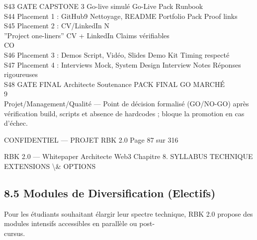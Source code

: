 \documentclass[12pt,landscape,a4paper]{article}
\newenvironment{confidential}
{\begin{tcolorbox}[
    colback=rbkred!5!white,
    colframe=rbkred!75!black,
    title=CONFIDENTIEL,
    fonttitle=\bfseries\color{white},
    coltitle=rbkred!75!black,
    breakable,
    enhanced,
    frame hidden,
    borderline west={2pt}{0pt}{rbkred!75!black}
]}
{\end{tcolorbox}}
\begin{document}
S43 GATE CAPSTONE 3                      Go-live simulé                   Go-Live Pack             Runbook\\
S44 Placement 1 : GitHub9                Nettoyage, README                Portfolio Pack           Proof links\\
S45 Placement 2 : CV/LinkedIn            N\\
”Project one-liners”             CV + LinkedIn            Claims vérifiables\\
CO\\
S46 Placement 3 : Demos                  Script, Vidéo, Slides            Demo Kit                 Timing respecté\\
S47 Placement 4 : Interviews             Mock, System Design              Interview Notes          Réponses rigoureuses\\
S48 GATE FINAL Architecte                Soutenance                       PACK FINAL               GO MARCHÉ\\
\vspace{0.5em}
\vspace{0.5em}
\vspace{0.5em}
\vspace{0.5em}
9\\
Projet/Management/Qualité — Point de décision formalisé (GO/NO-GO) après vérification build, scripts et absence de hardcodes ; bloque la promotion en cas d’échec.\\
\vspace{0.5em}
\vspace{0.5em}
\begin{confidential}CONFIDENTIEL — PROJET RBK 2.0                                            Page 87 sur 316\end{confidential}
RBK 2.0 — Whitepaper Architecte Web3                                                                  Chapitre 8. SYLLABUS TECHNIQUE\\
\vspace{0.5em}
\vspace{0.5em}
\vspace{0.5em}
EXTENSIONS \textbackslash{}& OPTIONS\\
\vspace{0.5em}
\subsection{8.5 Modules de Diversification (Electifs)}
Pour les étudiants souhaitant élargir leur spectre technique, RBK 2.0 propose des modules intensifs accessibles en parallèle ou post-\\
cursus.\\
\vspace{0.5em}
\vspace{0.5em}
\end{document}
